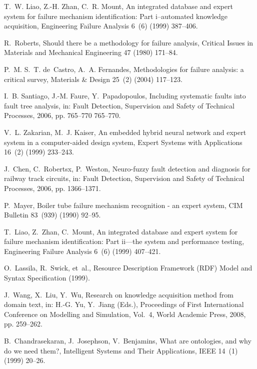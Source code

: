 \documentclass{elsart}
\begin{document}
\begin{thebibliography}{10}
T.~W. Liao, Z.-H. Zhan, C.~R. Mount,
  {An integrated database and expert system for failure
  mechanism identification: Part i--automated knowledge acquisition},
  Engineering Failure Analysis 6~(6) (1999) 387--406.


R.~Roberts, Should there be a methodology for failure analysis, Critical Issues
  in Materials and Mechanical Engineering 47 (1980) 171--84.

P.~M. S.~T. de~Castro, A.~A. Fernandes,
 {Methodologies for failure analysis: a critical
  survey}, Materials \& Design 25~(2) (2004) 117--123.


I.~B. Santiago, J.-M. Faure, Y.~Papadopoulos, Including systematic faults into
  fault tree analysis, in: Fault Detection, Supervision and Safety of Technical
  Processes, 2006, pp. 765--770 765--770.

V.~L. Zakarian, M.~J. Kaiser,
 {An embedded hybrid neural network and expert system
  in a computer-aided design system}, Expert Systems with Applications 16~(2)
  (1999) 233--243.


J.~Chen, C.~Robertsx, P.~Weston, Neuro-fuzzy fault detection and diagnosis for
  railway track circuits, in: Fault Detection, Supervision and Safety of
  Technical Processes, 2006, pp. 1366--1371.

P.~Mayer, Boiler tube failure mechanism recognition - an expert system, CIM
  Bulletin 83~(939) (1990) 92--95.

T.~Liao, Z.~Zhan, C.~Mount, An integrated database and expert system for
  failure mechanism identification: Part ii—the system and performance
  testing, Engineering Failure Analysis 6~(6) (1999) 407--421.

O.~Lassila, R.~Swick, et~al., {Resource Description Framework (RDF) Model and
  Syntax Specification} (1999).

J.~Wang, X.~Liu, Y.~Wu, Research on knowledge acquisition method from domain
  text, in: H.-G. Yu, Y.~Jiang (Eds.), Proceedings of First International
  Conference on Modelling and Simulation, Vol.~4, World Academic Press, 2008,
  pp. 259--262.

B.~Chandrasekaran, J.~Josephson, V.~Benjamins, What are ontologies, and why do
  we need them?, Intelligent Systems and Their Applications, IEEE 14~(1) (1999)
  20--26.



\end{thebibliography}
\end{document}
